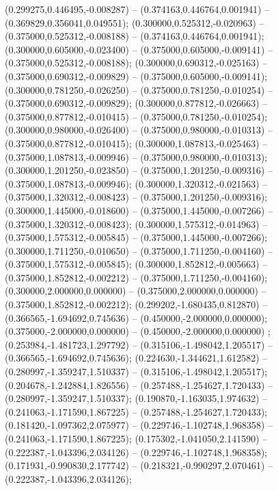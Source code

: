  (0.299275,0.446495,-0.008287) -- (0.374163,0.446764,0.001941) -- (0.369829,0.356041,0.049551);
 (0.300000,0.525312,-0.020963) -- (0.375000,0.525312,-0.008188) -- (0.374163,0.446764,0.001941);
 (0.300000,0.605000,-0.023400) -- (0.375000,0.605000,-0.009141) -- (0.375000,0.525312,-0.008188);
 (0.300000,0.690312,-0.025163) -- (0.375000,0.690312,-0.009829) -- (0.375000,0.605000,-0.009141);
 (0.300000,0.781250,-0.026250) -- (0.375000,0.781250,-0.010254) -- (0.375000,0.690312,-0.009829);
 (0.300000,0.877812,-0.026663) -- (0.375000,0.877812,-0.010415) -- (0.375000,0.781250,-0.010254);
 (0.300000,0.980000,-0.026400) -- (0.375000,0.980000,-0.010313) -- (0.375000,0.877812,-0.010415);
 (0.300000,1.087813,-0.025463) -- (0.375000,1.087813,-0.009946) -- (0.375000,0.980000,-0.010313);
 (0.300000,1.201250,-0.023850) -- (0.375000,1.201250,-0.009316) -- (0.375000,1.087813,-0.009946);
 (0.300000,1.320312,-0.021563) -- (0.375000,1.320312,-0.008423) -- (0.375000,1.201250,-0.009316);
 (0.300000,1.445000,-0.018600) -- (0.375000,1.445000,-0.007266) -- (0.375000,1.320312,-0.008423);
 (0.300000,1.575312,-0.014963) -- (0.375000,1.575312,-0.005845) -- (0.375000,1.445000,-0.007266);
 (0.300000,1.711250,-0.010650) -- (0.375000,1.711250,-0.004160) -- (0.375000,1.575312,-0.005845);
 (0.300000,1.852812,-0.005663) -- (0.375000,1.852812,-0.002212) -- (0.375000,1.711250,-0.004160);
 (0.300000,2.000000,0.000000) -- (0.375000,2.000000,0.000000) -- (0.375000,1.852812,-0.002212);
 (0.299202,-1.680435,0.812870) -- (0.366565,-1.694692,0.745636) -- (0.450000,-2.000000,0.000000);
 (0.375000,-2.000000,0.000000) -- (0.450000,-2.000000,0.000000) ;
 (0.253984,-1.481723,1.297792) -- (0.315106,-1.498042,1.205517) -- (0.366565,-1.694692,0.745636);
 (0.224630,-1.344621,1.612582) -- (0.280997,-1.359247,1.510337) -- (0.315106,-1.498042,1.205517);
 (0.204678,-1.242884,1.826556) -- (0.257488,-1.254627,1.720433) -- (0.280997,-1.359247,1.510337);
 (0.190870,-1.163035,1.974632) -- (0.241063,-1.171590,1.867225) -- (0.257488,-1.254627,1.720433);
 (0.181420,-1.097362,2.075977) -- (0.229746,-1.102748,1.968358) -- (0.241063,-1.171590,1.867225);
 (0.175302,-1.041050,2.141590) -- (0.222387,-1.043396,2.034126) -- (0.229746,-1.102748,1.968358);
 (0.171931,-0.990830,2.177742) -- (0.218321,-0.990297,2.070461) -- (0.222387,-1.043396,2.034126);

